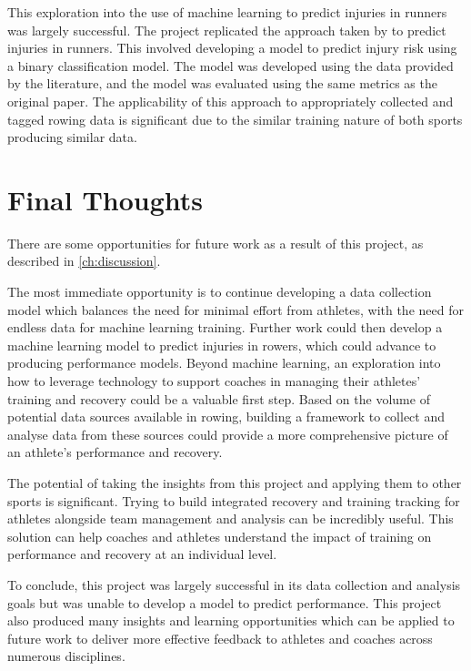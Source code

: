 This exploration into the use of machine learning to predict injuries in runners was largely successful. The project replicated the approach taken by \textcite{Lovdal2021} to predict injuries in runners. This involved developing a model to predict injury risk using a binary classification model. The model was developed using the data provided by the literature, and the model was evaluated using the same metrics as the original paper. The applicability of this approach to appropriately collected and tagged rowing data is significant due to the similar training nature of both sports producing similar data.

\section{Final Thoughts}
There are some opportunities for future work as a result of this project, as described in \autoref{ch:discussion}. 

The most immediate opportunity is to continue developing a data collection model which balances the need for minimal effort from athletes, with the need for endless data for machine learning training. Further work could then develop a machine learning model to predict injuries in rowers, which could advance to producing performance models. Beyond machine learning, an exploration into how to leverage technology to support coaches in managing their athletes' training and recovery could be a valuable first step. Based on the volume of potential data sources available in rowing, building a framework to collect and analyse data from these sources could provide a more comprehensive picture of an athlete's performance and recovery.

The potential of taking the insights from this project and applying them to other sports is significant.
Trying to build integrated recovery and training tracking for athletes alongside team management and analysis can be incredibly useful. This solution can help coaches and athletes understand the impact of training on performance and recovery at an individual level.

To conclude, this project was largely successful in its data collection and analysis goals but was unable to develop a model to predict performance. This project also produced many insights and learning opportunities which can be applied to future work to deliver more effective feedback to athletes and coaches across numerous disciplines.